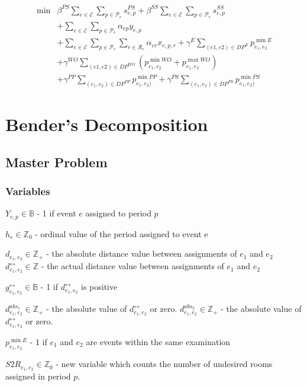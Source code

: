 \documentclass{article}
\newcommand{\scriptP}{\mathcal{P}}
\newcommand{\scriptR}{\mathcal{R}}
\newcommand{\scriptE}{\mathcal{E}}
\newcommand{\B}{\mathbb{B}}
\newcommand{\Z}{\mathbb{Z}}
\begin{document}
\begin{align} 
    \min &\beta^{PS}\sum_{e\in \scriptE}\sum_{p\in\scriptP_e}s^{PS}_{e,p} + \beta^{SS}\sum_{e\in\scriptE}\sum_{p\in\scriptP_e}s^{SS}_{e,p} \\
    &+\sum_{e\in\scriptE}\sum_{p\in\scriptP_e}\alpha_{ep}y_{e,p} \\
    &+\sum_{e\in\scriptE}\sum_{p\in\scriptP_e}\sum_{r\in\scriptR_e}\alpha_{er}x_{e,p,r}
    + \gamma^E\sum_{(e1, e2)\in DP^{E}} p^{\min E}_{e_1, e_2} \\
    &+ \gamma^{WO} \sum_{(e1, e2)\in DP^{WO}}\left(p^{\min WO}_{e_1, e_2} + p^{\max WO}_{e_1, e_2}\right) \\
    &+ \gamma^{PP}\sum_{(e_1, e_2)\in DP^{PP}} p^{\min PP}_{e_1, e_2)}
    + \gamma^{PS}\sum_{(e_1, e_2)\in DP^{PS}} p^{\min PS}_{e_1, e_2)}
\end{align}


\section{Bender's Decomposition}

\subsection{Master Problem}

\subsubsection{Variables}


$Y_{e,p} \in \B$ - 1 if event $e$ assigned to period $p$

$h_e\in \Z_0$ - ordinal value of the period assigned to event e

$d_{e_1, e_2} \in \Z_+$ - the absolute distance value between assignments of $e_1$ and $e_2$
$d^{\leftrightarrow}_{e_1, e_2} \in \Z$ - the actual distance value between assignments of $e_1$ and $e_2$

$g^{\leftrightarrow}_{e_1, e_2} \in \B$ - 1 if $d^{\leftrightarrow}_{e_1, e_2}$ is positive

$d^{abs_1}_{e_1, e_2}\in \Z_+$ - the absolute value of $d^{\leftrightarrow}_{e_1, e_2}$ or zero.
$d^{abs_2}_{e_1, e_2}\in \Z_+$ - the absolute value of $d^{\leftrightarrow}_{e_1, e_2}$ or zero.

$p^{\min E}_{e_1, e_2}$ - 1 if $e_1$ and $e_2$ are events within the same examination

$S2R_{e_1, e_2} \in \Z_0$ - new variable which counts the number of undesired rooms assigned in period $p$.
\end{document}
